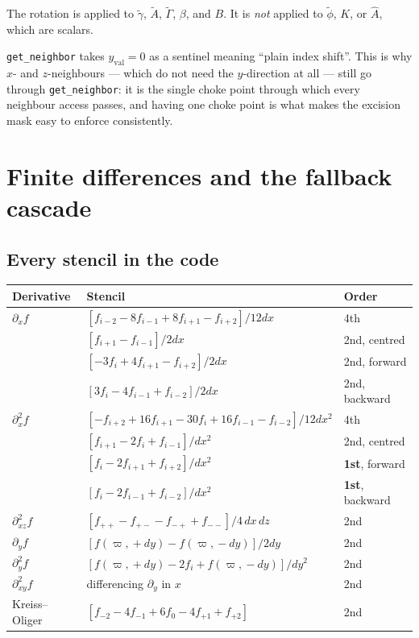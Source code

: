 \documentclass[11pt,openany]{book}
\newcommand{\gam}{\tilde{\gamma}}
\newcommand{\ph}{\tilde{\phi}}
\newcommand{\At}{\tilde{A}}
\newcommand{\Gt}{\tilde{\Gamma}}
\begin{document}
The rotation is applied to $\gam$, $\At$, $\Gt$, $\beta$, and $B$. It is
\emph{not} applied to $\ph$, $K$, or $\hat{A}$, which are scalars.

\gotcha
\texttt{get\_neighbor} takes $y_{\mathrm{val}} = 0$ as a sentinel meaning
``plain index shift''. This is why $x$- and $z$-neighbours --- which do not need
the $y$-direction at all --- still go through \texttt{get\_neighbor}: it is
the single choke point through which every neighbour access passes, and having
one choke point is what makes the excision mask easy to enforce consistently.

\section{Finite differences and the fallback cascade}

\label{sec:stencils}
\subsection{Every stencil in the code}

\begin{longtable}{@{}p{2.3cm}p{7.2cm}p{5.4cm}@{}}
\toprule
\textbf{Derivative} & \textbf{Stencil} & \textbf{Order} \\
\midrule
\endhead
$\partial_x f$ & $\left[f_{i-2} - 8f_{i-1} + 8f_{i+1} - f_{i+2}\right]/12dx$ & 4th \\
 & $\left[f_{i+1} - f_{i-1}\right]/2dx$ & 2nd, centred \\
 & $\left[-3f_i + 4f_{i+1} - f_{i+2}\right]/2dx$ & 2nd, forward \\
 & $\left[3f_i - 4f_{i-1} + f_{i-2}\right]/2dx$ & 2nd, backward \\
\addlinespace
$\partial^2_x f$ & $\left[-f_{i+2}+16f_{i+1}-30f_i+16f_{i-1}-f_{i-2}\right]/12dx^2$ & 4th \\
 & $\left[f_{i+1} - 2f_i + f_{i-1}\right]/dx^2$ & 2nd, centred \\
 & $\left[f_i - 2f_{i+1} + f_{i+2}\right]/dx^2$ & \textbf{1st}, forward \\
 & $\left[f_i - 2f_{i-1} + f_{i-2}\right]/dx^2$ & \textbf{1st}, backward \\
\addlinespace
$\partial^2_{xz} f$ & $\left[f_{++} - f_{+-} - f_{-+} + f_{--}\right]/4\,dx\,dz$ & 2nd \\
\addlinespace
$\partial_y f$ & $\left[f(\varpi,\!+dy) - f(\varpi,\!-dy)\right]/2dy$ & 2nd \\
$\partial^2_y f$ & $\left[f(\varpi,\!+dy) - 2f_i + f(\varpi,\!-dy)\right]/dy^2$ & 2nd \\
\addlinespace
$\partial^2_{xy} f$ & differencing $\partial_y$ in $x$ & 2nd \\
\addlinespace
Kreiss--Oliger & $\left[f_{-2}-4f_{-1}+6f_0-4f_{+1}+f_{+2}\right]$ & 2nd \\
\bottomrule
\end{longtable}
\end{document}
